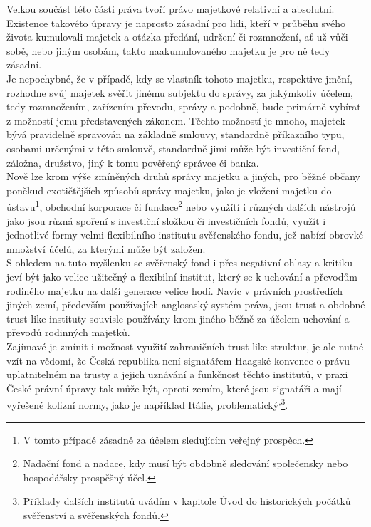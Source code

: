 \documentclass{article}
\begin{document}
Velkou součást této části práva tvoří právo majetkové relativní a absolutní. Existence takovéto úpravy je naprosto zásadní pro lidi, kteří v průběhu svého života kumulovali majetek a otázka předání, udržení či rozmnožení, ať už vůči sobě, nebo jiným osobám, takto naakumulovaného majetku je pro ně tedy zásadní.\\

Je nepochybné, že v případě, kdy se vlastník tohoto majetku, respektive jmění, rozhodne svůj majetek svěřit jinému subjektu do správy, za jakýmkoliv účelem, tedy rozmnožením, zařízením převodu, správy a podobně, bude primárně vybírat z možností jemu představených zákonem. Těchto možností je mnoho, majetek bývá pravidelně spravován na základně smlouvy, standardně příkazního typu, osobami určenými v této smlouvě, standardně jimi může být investiční fond, záložna, družstvo, jiný k tomu pověřený správce či banka.\\

Nově lze krom výše zmíněných druhů správy majetku a jiných, pro běžné občany poněkud exotičtějších způsobů správy majetku, jako je vložení majetku do ústavu\footnote{V tomto případě zásadně za účelem sledujícím veřejný prospěch.}, obchodní korporace či fundace\footnote{Nadační fond a nadace, kdy musí být obdobně sledování společensky nebo hospodářsky prospěšný účel.} nebo využítí i různých dalších nástrojů jako jsou různá spoření s investiční složkou či investičních fondů, využít i jednotlivé formy velmi flexibilního institutu svěřenského fondu, jež nabízí obrovké množství účelů, za kterými může být založen.\\

S ohledem na tuto myšlenku se svěřenský fond i přes negativní ohlasy a kritiku jeví být jako velice užitečný a flexibilní institut, který se k uchování a převodům rodiného majetku na další generace velice hodí. Navíc v právních prostředích jiných zemí, především používajích anglosaský systém práva, jsou trust a obdobné trust-like instituty souvisle používány krom jiného běžně za účelem uchování a převodů rodinných majetků.\\

Zajímavé je zmínit i možnost využití zahraničních trust-like struktur, je ale nutné vzít na vědomí, že Česká republika není signatářem Haagské konvence o právu uplatnitelném na trusty a jejich uznávání a funkčnost těchto institutů, v praxi České právní úpravy tak může být, oproti zemím, které jsou signatáři a mají vyřešené kolizní normy, jako je například Itálie, problematický\textsuperscript{,}\footnote{Příklady dalších institutů uvádím v kapitole Úvod do historických počátků svěřenství a svěřenských fondů.}.\\
\end{document}
